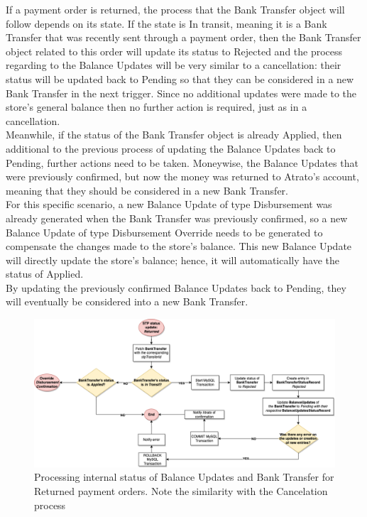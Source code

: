 If a payment order is returned, the process that the Bank Transfer object will follow depends on its state. If the state is In transit, meaning it is a Bank Transfer that was recently sent through a payment order, then the Bank Transfer object related to this order will update its status to Rejected and the process regarding to the Balance Updates will be very similar to a cancellation: their status will be updated back to Pending so that they can be considered in a new Bank Transfer in the next trigger. Since no additional updates were made to the store’s general balance then no further action is required, just as in a cancellation.\\

Meanwhile, if the status of the Bank Transfer object is already Applied, then additional to the previous process of updating the Balance Updates back to Pending, further actions need to be taken. Moneywise, the Balance Updates that were previously confirmed, but now the money was returned to Atrato’s account, meaning that they should be considered in a new Bank Transfer.\\

For this specific scenario, a new Balance Update of type Disbursement was already generated when the Bank Transfer was previously confirmed, so a new Balance Update of type Disbursement Override needs to be generated to compensate the changes made to the store’s balance. This new Balance Update will directly update the store’s balance; hence, it will automatically have the status of Applied.\\

By updating the previously confirmed Balance Updates back to Pending, they will eventually be considered into a new Bank Transfer.

\begin{figure} [H]
    \centering
    \includegraphics[scale = 0.4]{assets/diagrams/ReturnedStatus.png}
    \caption{Processing internal status of Balance Updates and Bank Transfer for Returned payment orders. Note the similarity with the Cancelation process}\label{fig:returned_status_update}
\end{figure}
